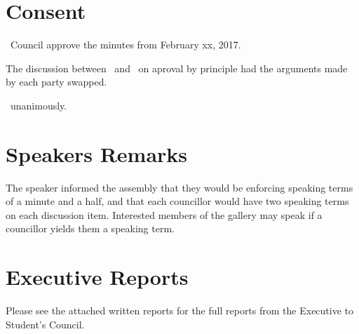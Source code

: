 \section*{Consent}

\begin{motion}
    \birt\ Council approve the minutes from February xx, 2017.
    \movers{\seneca}{\jennifer}

    The discussion between \seneca\ and \brian\ on aproval by principle had
    the arguments made by each party swapped.

    \carries\ unanimously.
\end{motion}

\section*{Speakers Remarks}

The speaker informed the assembly that they would be enforcing speaking terms 
of a minute and a half, and that each councillor would have two speaking terms
on each discussion item. Interested members of the gallery may speak if a 
councillor yields them a speaking term.

\section*{Executive Reports}

Please see the attached written reports for the full reports from the Executive
to Student's Council. 

